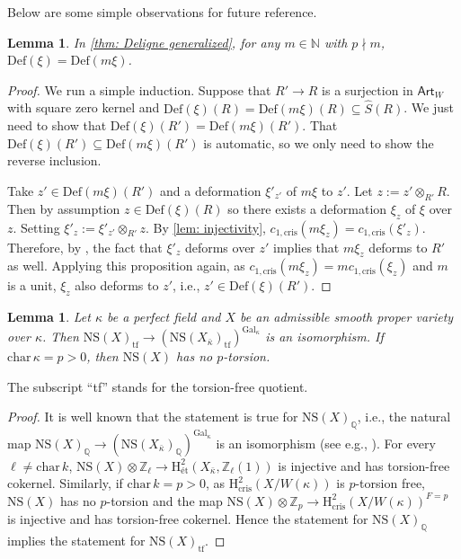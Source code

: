 \documentclass[letter, 11pt]{article}
\theoremstyle{plain}
\newtheorem{lemma}[subsubsection]{Lemma}
\theoremstyle{definition}
\newcommand{\IN}{\mathbb{N}}
\newcommand{\IQ}{\mathbb{Q}}
\newcommand{\IZ}{\mathbb{Z}}
\newcommand\tensor{{\otimes}}
\newcommand{\<}{\langle}
\renewcommand{\>}{\rangle}
\renewcommand{\H}{\mathrm{H}}
\newcommand{\Def}{\mathrm{Def}}
\newcommand{\et}{\textrm{{\'e}t}}
\newcommand{\cris}{\mathrm{cris}}
\newcommand{\NS}{\mathrm{NS}}
\newcommand{\Gal}{\mathrm{Gal}}
\begin{document}
Below are some simple observations for future reference. 
\begin{lemma}
\label{lem: Def(xi)}
    In \ref{thm: Deligne generalized}, for any $m \in \IN$ with $p \nmid m$, $\Def(\xi) = \Def(m \xi)$. 
\end{lemma}
\begin{proof}
    We run a simple induction. Suppose that $R' \to R$ is a surjection in $\mathsf{Art}_W$ with square zero kernel and $\Def(\xi)(R) = \Def(m \xi)(R) \subseteq \hat{S}(R)$. We just need to show that $\Def(\xi)(R') = \Def(m \xi)(R')$. That $\Def(\xi)(R') \subseteq \Def(m \xi)(R')$ is automatic, so we only need to show the reverse inclusion. 
    
    Take $z' \in \Def(m \xi)(R')$ and a deformation $\xi'_{z'}$ of $m\xi$ to $z'$. Let $z := z' \tensor_{R'} R$. Then by assumption $z \in \Def(\xi)(R)$ so there exists a deformation $\xi_z$ of $\xi$ over $z$. Setting $\xi'_z := \xi'_{z'} \tensor_{R'} z$. By \ref{lem: injectivity}, $c_{1, \cris}(m \xi_z) = c_{1, \cris}(\xi'_z)$. Therefore, by \cite[Prop.~1.12]{OgusCrystals}, the fact that $\xi'_z$ deforms over $z'$ implies that $m \xi_z$ deforms to $R'$ as well. Applying this proposition again, as $c_{1, \cris}(m \xi_z) = m c_{1, \cris}(\xi_z)$ and $m$ is a unit, $\xi_z$ also deforms to $z'$, i.e., $z' \in \Def(\xi)(R')$. 
\end{proof}
\begin{lemma}
\label{lem: Galois descent}
    Let $\kappa$ be a perfect field and $X$ be an admissible smooth proper variety over $\kappa$. Then $\NS(X)_{\mathrm{tf}} \to (\NS(X_{\bar{\kappa}})_{\mathrm{tf}})^{\Gal_\kappa}$ is an isomorphism. If $\mathrm{char\,} \kappa = p > 0$, then $\NS(X)$ has no $p$-torsion. 
\end{lemma}
 The subscript ``tf'' stands for the torsion-free quotient.
\begin{proof}
It is well known that the statement is true for $\NS(X)_\IQ$, i.e., the natural map $\NS(X)_{\IQ} \to (\NS(X_{\bar{\kappa}})_\IQ)^{\Gal_\kappa}$ is an isomorphism (see e.g., \cite[Prop.~6.1(b)]{PTL}). For every $\ell \neq \mathrm{char\,}k$, $\NS(X) \tensor \IZ_\ell \to \H^2_\et(X_{\bar{\kappa}}, \IZ_\ell(1))$ is injective and has torsion-free cokernel. Similarly, if $\mathrm{char\,} k = p > 0$, as $\H^2_\cris(X/W(\kappa))$ is $p$-torsion free, $\NS(X)$ has no $p$-torsion and the map $\NS(X) \tensor \IZ_p \to \H^2_\cris(X/W(\kappa))^{F = p}$ is injective and has torsion-free cokernel. Hence the statement for $\NS(X)_\IQ$ implies the statement for $\NS(X)_{\mathrm{tf}}$. 
\end{proof}
\end{document}

